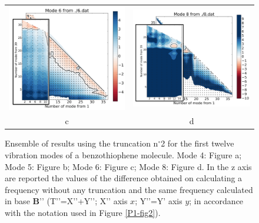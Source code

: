 \begin{figure}[H]
\begin{center}
\begin{tabular}{c c}
				\includegraphics[scale=0.2]{image/image/P1-43} & \includegraphics[scale=0.2]{image/image/P1-44}\\
				c & d\\
			\end{tabular}
		\end{center}
		\caption[Ensemble of results using the truncation n$^{\circ}$2 for the first twelve vibration modes of a benzothiophene molecule]{Ensemble of results using the truncation n$^{\circ}$2 for the first twelve vibration modes of a benzothiophene molecule. Mode 4: Figure a; Mode 5: Figure b; Mode 6: Figure c;  Mode 8: Figure d.
			In the z axis are reported the values of the difference obtained on calculating a frequency without any truncation and the same frequency calculated in base $\textbf{B’’}$ (T’’=X’’+Y’’; X’’ axis $x$; Y’’=Y’ axis $y$; in accordance with the notation used in Figure \ref{P1-fig2}).}  \label{P1-F4}
	\end{figure}
	
